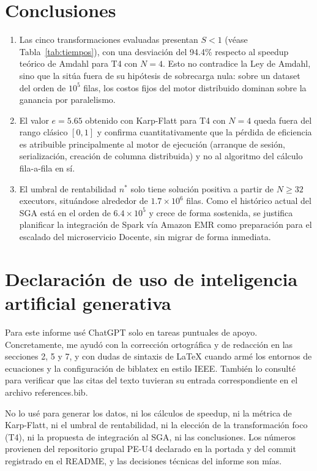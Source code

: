 \documentclass[11pt,a4paper]{article}
\begin{document}
\section{Conclusiones}
\begin{enumerate}
\item Las cinco transformaciones evaluadas presentan $S<1$ (véase Tabla~\ref{tab:tiempos}), con una desviación del 94.4\% respecto al speedup teórico de Amdahl para T4 con $N=4$. Esto no contradice la Ley de Amdahl, sino que la sitúa fuera de su hipótesis de sobrecarga nula: sobre un dataset del orden de $10^5$ filas, los costos fijos del motor distribuido dominan sobre la ganancia por paralelismo.

\item El valor $e = 5.65$ obtenido con Karp-Flatt para T4 con $N=4$ queda fuera del rango clásico $[0,1]$ y confirma cuantitativamente que la pérdida de eficiencia es atribuible principalmente al motor de ejecución (arranque de sesión, serialización, creación de columna distribuida) y no al algoritmo del cálculo fila-a-fila en sí.

\item El umbral de rentabilidad $n^{*}$ solo tiene solución positiva a partir de $N \geq 32$ executors, situándose alrededor de $1.7 \times 10^{6}$ filas. Como el histórico actual del SGA está en el orden de $6.4 \times 10^{5}$ y crece de forma sostenida, se justifica planificar la integración de Spark vía Amazon EMR como preparación para el escalado del microservicio Docente, sin migrar de forma inmediata.
\end{enumerate}

\section{Declaración de uso de inteligencia artificial generativa}
Para este informe usé ChatGPT solo en tareas puntuales de apoyo. Concretamente, me ayudó con la corrección ortográfica y de redacción en las secciones 2, 5 y 7, y con dudas de sintaxis de LaTeX cuando armé los entornos de ecuaciones y la configuración de biblatex en estilo IEEE. También lo consulté para verificar que las citas del texto tuvieran su entrada correspondiente en el archivo references.bib.

No lo usé para generar los datos, ni los cálculos de speedup, ni la métrica de Karp-Flatt, ni el umbral de rentabilidad, ni la elección de la transformación foco (T4), ni la propuesta de integración al SGA, ni las conclusiones. Los números provienen del repositorio grupal PE-U4 declarado en la portada y del commit registrado en el README, y las decisiones técnicas del informe son mías.

\printbibliography
\end{document}
